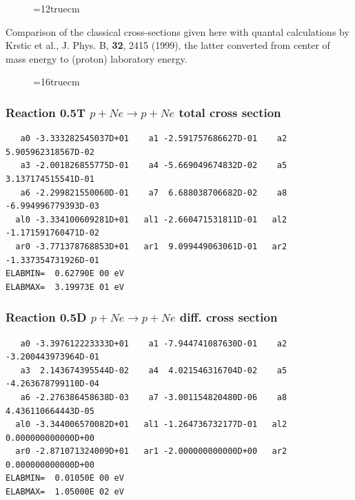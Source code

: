 \documentclass[12pt,dvips]{article}
\begin{document}
\begin{figure}[hb] \label{0.3a}
\epsfxsize=12truecm
\end{figure}
Comparison of the classical cross-sections given here with quantal calculations
by Krstic et al., J. Phys. B, \textbf{32}, 2415 (1999), the latter converted from center of mass energy to (proton) laboratory energy.

\newpage

\begin{figure} \label{0.3}
\epsfxsize=16truecm
\end{figure}
\newpage



\subsubsection{
Reaction 0.5T   $ p + Ne \rightarrow p + Ne $ total cross
section }



\begin{small}\begin{verbatim}
   a0 -3.333282545037D+01    a1 -2.591757686627D-01    a2  5.905962318567D-02
   a3 -2.001826855775D-01    a4 -5.669049674832D-02    a5  3.137174515541D-01
   a6 -2.299821550060D-01    a7  6.688038706682D-02    a8 -6.994996779393D-03
  al0 -3.334100609281D+01   al1 -2.660471531811D-01   al2 -1.171591760471D-02
  ar0 -3.771378768853D+01   ar1  9.099449063061D-01   ar2 -1.337354731926D-01
ELABMIN=  0.62790E 00 eV
ELABMAX=  3.19973E 01 eV
\end{verbatim}\end{small}

\subsubsection{
Reaction 0.5D    $p + Ne \rightarrow p + Ne  $ diff. cross
section }


\begin{small}\begin{verbatim}
   a0 -3.397612223333D+01    a1 -7.944741087630D-01    a2 -3.200443973964D-01
   a3  2.143674395544D-02    a4  4.021546316704D-02    a5 -4.263678799110D-04
   a6 -2.276386458638D-03    a7 -3.001154820480D-06    a8  4.436110664443D-05
  al0 -3.344006570082D+01   al1 -1.264736732177D-01   al2  0.000000000000D+00
  ar0 -2.871071324009D+01   ar1 -2.000000000000D+00   ar2  0.000000000000D+00
ELABMIN=  0.01050E 00 eV
ELABMAX=  1.05000E 02 eV
\end{verbatim}\end{small}
\end{document}

